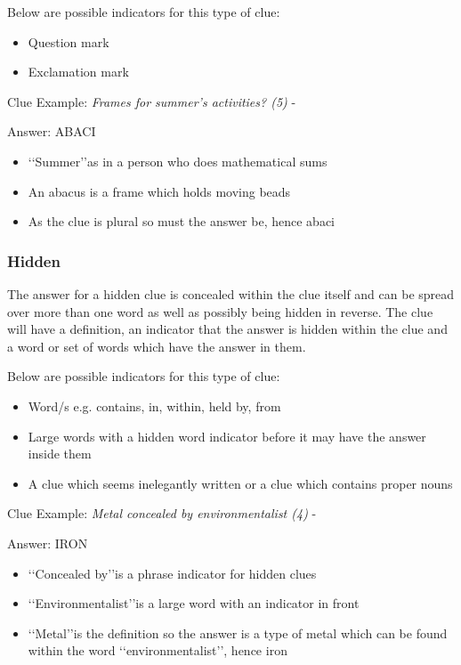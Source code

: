 Below are possible indicators for this type of clue:
\begin{itemize} 
	\item Question mark 
	\item Exclamation mark
\\
\end{itemize} 

Clue Example: \emph{Frames for summer's activities? (5)} - \citep{shuchiCryptic08}

Answer: ABACI 

\begin{itemize}
	\item \lq\lq Summer\rq\rq as in a person who does mathematical sums 
	\item An abacus is a frame which holds moving beads 
	\item As the clue is plural so must the answer be, hence abaci
\end{itemize}

\subsubsection{Hidden} 
The answer for a hidden clue is concealed within the clue itself and can be spread over more than one word as well as possibly being hidden in reverse. The clue will have a definition, an indicator that the answer is hidden within the clue and a word or set of words which have the answer in them.  

Below are possible indicators for this type of clue:
\begin{itemize} 
	\item Word/s e.g. contains, in, within, held by, from 
	\item Large words with a hidden word indicator before it may have the answer inside them 
	\item A clue which seems inelegantly written or a clue which contains proper nouns  
\\
\end{itemize}

Clue Example: \emph{Metal concealed by environmentalist (4)} - \citep{shuchiHidden08}

Answer: IRON 

\begin{itemize}
	\item \lq\lq Concealed by\rq\rq is a phrase indicator for hidden clues 
	\item \lq\lq Environmentalist\rq\rq is a large word with an indicator in front 
	\item \lq\lq Metal\rq\rq is the definition so the answer is a type of metal which can be found within the word \lq\lq environmentalist\rq\rq, hence iron 
\\
\end{itemize}

